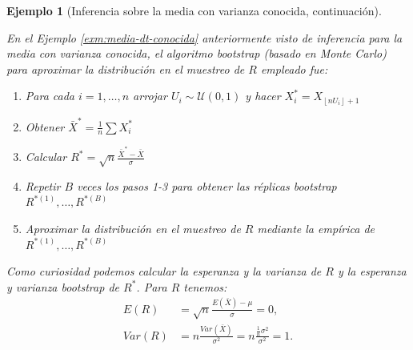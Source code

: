 \documentclass[
]{book}
\theoremstyle{break}
\newtheorem{example}{Ejemplo}[chapter]
\theoremstyle{nonumberplain}
\begin{document}
\begin{example}[Inferencia sobre la media con varianza conocida, continuación]
\protect\hypertarget{exm:media-dt-conocida-perturbando}{}\label{exm:media-dt-conocida-perturbando}

En el Ejemplo \ref{exm:media-dt-conocida} anteriormente visto de inferencia para la media con
varianza conocida, el algoritmo bootstrap (basado en Monte Carlo) para
aproximar la distribución en el muestreo de \(R\) empleado fue:

\begin{enumerate}
\def\labelenumi{\arabic{enumi}.}
\item
  Para cada \(i=1,\ldots ,n\) arrojar \(U_i\sim \mathcal{U}\left( 0,1 \right)\) y
  hacer \(X_i^{\ast}=X_{\left\lfloor nU_i\right\rfloor +1}\)
\item
  Obtener \(\bar{X}^{\ast}=\frac{1}{n}\sum X_i^{\ast}\)
\item
  Calcular
  \(R^{\ast}=\sqrt{n}\frac{\bar{X}^{\ast}-\bar{X}}{
  \sigma }\)
\item
  Repetir \(B\) veces los pasos 1-3 para obtener las réplicas bootstrap
  \(R^{\ast (1)}, \ldots, R^{\ast (B)}\)
\item
  Aproximar la distribución en el muestreo de \(R\) mediante la empírica
  de \(R^{\ast (1)}, \ldots, R^{\ast (B)}\)
\end{enumerate}

Como curiosidad podemos calcular la esperanza y la varianza de \(R\) y la
esperanza y varianza bootstrap de \(R^{\ast}\). Para \(R\) tenemos:
\[\begin{aligned}
E\left( R \right) &=\sqrt{n}\frac{E\left( \bar{X} \right) -\mu }{\sigma }
=0, \\
Var\left( R \right) &=n\frac{Var\left( \bar{X} \right)}{\sigma^2}=n
\frac{\frac{1}{n}\sigma^2}{\sigma^2}=1.
\end{aligned}\]


\end{example}
\end{document}
